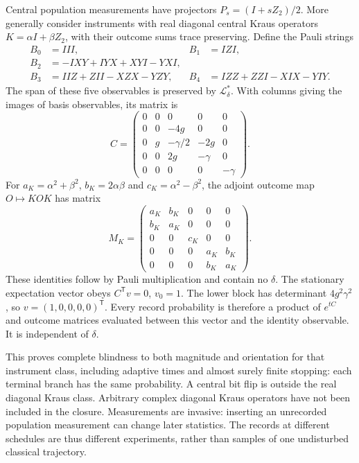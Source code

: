 Central population measurements have projectors $P_s=(I+sZ_2)/2$.
More generally consider instruments with real diagonal central Kraus operators
$K=\alpha I+\beta Z_2$, with their outcome sums trace preserving. Define
the Pauli strings
\begin{align}
 B_0&=III,&B_1&=IZI,\nonumber\\
 B_2&=-IXY+IYX+XYI-YXI,\nonumber\\
 B_3&=IIZ+ZII-XZX-YZY,&
 B_4&=IZZ+ZZI-XIX-YIY.
\end{align}
The span of these five observables is preserved by $\mathcal L_\delta^*$.
With columns giving the images of basis observables, its matrix is
\begin{equation}
 C=\begin{pmatrix}
 0&0&0&0&0\\0&0&-4g&0&0\\0&g&-\gamma/2&-2g&0\\
 0&0&2g&-\gamma&0\\0&0&0&0&-\gamma
 \end{pmatrix}.
 \label{eq:applications-xx-closure}
\end{equation}
For $a_K=\alpha^2+\beta^2$, $b_K=2\alpha\beta$ and
$c_K=\alpha^2-\beta^2$, the adjoint outcome map $O\mapsto KOK$ has matrix
\begin{equation}
 M_K=\begin{pmatrix}
 a_K&b_K&0&0&0\\b_K&a_K&0&0&0\\0&0&c_K&0&0\\
 0&0&0&a_K&b_K\\0&0&0&b_K&a_K
 \end{pmatrix}.
\end{equation}
These identities follow by Pauli multiplication and contain no $\delta$.
The stationary expectation vector obeys $C^{\mathsf T}v=0$, $v_0=1$.
The lower block has determinant $4g^2\gamma^2$, so
$v=(1,0,0,0,0)^{\mathsf T}$. Every record probability is therefore a product
of $e^{tC}$ and outcome matrices evaluated between this vector and the
identity observable. It is independent of $\delta$.

This proves complete blindness to both magnitude and orientation for that
instrument class, including adaptive times and almost surely finite
stopping: each terminal branch has the same probability. A central bit flip
is outside the real diagonal Kraus class. Arbitrary complex diagonal Kraus
operators have not been included in the closure. Measurements are invasive:
inserting an unrecorded population measurement can change later statistics.
The records at different schedules are thus different experiments, rather
than samples of one undisturbed classical trajectory.

